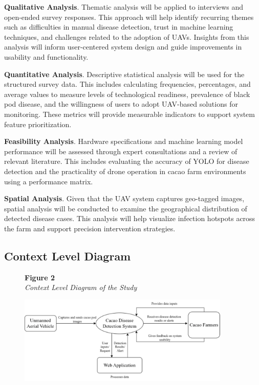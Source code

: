 \textbf{Qualitative Analysis}. Thematic analysis will be applied to interviews and open-ended survey responses. This approach will help identify recurring themes such as difficulties in manual disease detection, trust in machine learning techniques, and challenges related to the adoption of UAVs. Insights from this analysis will inform user-centered system design and guide improvements in usability and functionality.

\textbf{Quantitative Analysis}. Descriptive statistical analysis will be used for the structured survey data. This includes calculating frequencies, percentages, and average values to measure levels of technological readiness, prevalence of black pod disease, and the willingness of users to adopt UAV-based solutions for monitoring. These metrics will provide measurable indicators to support system feature prioritization.


\textbf{Feasibility Analysis}. Hardware specifications and machine learning model performance will be assessed through expert consultations and a review of relevant literature. This includes evaluating the accuracy of YOLO for disease detection and the practicality of drone operation in cacao farm environments using a performance matrix.

\textbf{Spatial Analysis}. Given that the UAV system captures geo-tagged images, spatial analysis will be conducted to examine the geographical distribution of detected disease cases. This analysis will help visualize infection hotspots across the farm and support precision intervention strategies.


\subsection{Context Level Diagram}

\begin{figure}[H]
	\raggedright
	\textbf{Figure 2} \\ %
	\textit{Context Level Diagram of the Study} %

	\vspace{0.5em}
	\centering
	\includegraphics[width=0.9\textwidth]{figures/Context-Level.pdf} %

	\vspace{0.5em}
	\raggedright

	\label{fig:context-level}
\end{figure}

